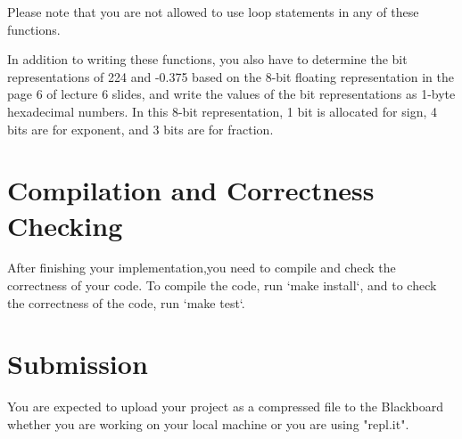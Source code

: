 \documentclass[twoside,11pt]{article}
\begin{document}
Please note that you are not allowed to use loop statements in any of these functions. 

In addition to writing these functions, you also have to determine the bit representations of 
224 and -0.375 based on the 8-bit floating representation in the page 6 of lecture 6 slides, 
and write the values of the bit representations as 1-byte hexadecimal numbers. In this 8-bit 
representation, 1 bit is allocated for sign, 4 bits are for exponent, and 3 bits are for fraction.

\section{Compilation and Correctness Checking}

After finishing your implementation,you need to compile and check the correctness of your code. To compile the code, run `make install`, and to check the correctness of the code, run `make test`.

\section{Submission}

You are expected to upload your project as a compressed file to the Blackboard whether you are working on your local machine or you are using "repl.it".


\newpage
\end{document}
